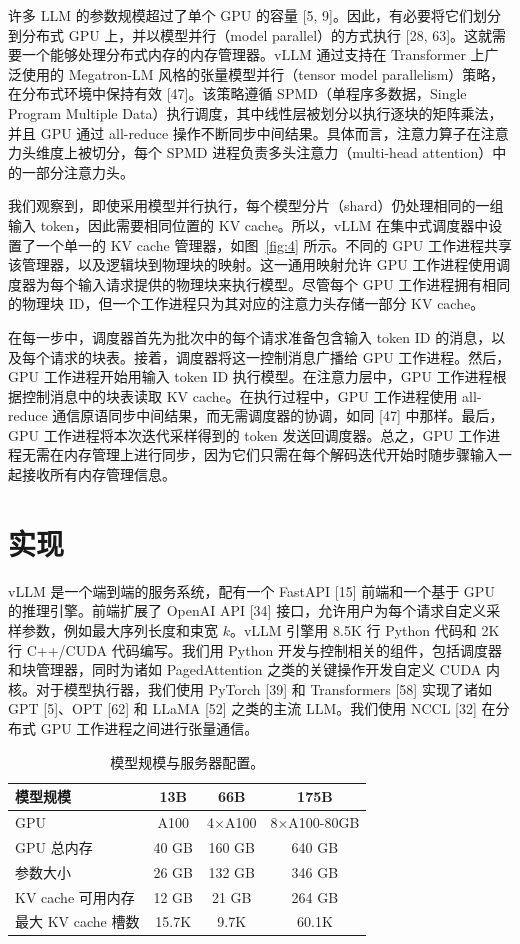 \documentclass[11pt,UTF8,fontset=fandol]{ctexart}
\begin{document}
许多 LLM 的参数规模超过了单个 GPU 的容量 [5, 9]。因此，有必要将它们划分到分布式 GPU 上，并以模型并行（model parallel）的方式执行 [28, 63]。这就需要一个能够处理分布式内存的内存管理器。vLLM 通过支持在 Transformer 上广泛使用的 Megatron-LM 风格的张量模型并行（tensor model parallelism）策略，在分布式环境中保持有效 [47]。该策略遵循 SPMD（单程序多数据，Single Program Multiple Data）执行调度，其中线性层被划分以执行逐块的矩阵乘法，并且 GPU 通过 all-reduce 操作不断同步中间结果。具体而言，注意力算子在注意力头维度上被切分，每个 SPMD 进程负责多头注意力（multi-head attention）中的一部分注意力头。

我们观察到，即使采用模型并行执行，每个模型分片（shard）仍处理相同的一组输入 token，因此需要相同位置的 KV cache。所以，vLLM 在集中式调度器中设置了一个单一的 KV cache 管理器，如图~\ref{fig:4} 所示。不同的 GPU 工作进程共享该管理器，以及逻辑块到物理块的映射。这一通用映射允许 GPU 工作进程使用调度器为每个输入请求提供的物理块来执行模型。尽管每个 GPU 工作进程拥有相同的物理块 ID，但一个工作进程只为其对应的注意力头存储一部分 KV cache。

在每一步中，调度器首先为批次中的每个请求准备包含输入 token ID 的消息，以及每个请求的块表。接着，调度器将这一控制消息广播给 GPU 工作进程。然后，GPU 工作进程开始用输入 token ID 执行模型。在注意力层中，GPU 工作进程根据控制消息中的块表读取 KV cache。在执行过程中，GPU 工作进程使用 all-reduce 通信原语同步中间结果，而无需调度器的协调，如同 [47] 中那样。最后，GPU 工作进程将本次迭代采样得到的 token 发送回调度器。总之，GPU 工作进程无需在内存管理上进行同步，因为它们只需在每个解码迭代开始时随步骤输入一起接收所有内存管理信息。

\section{实现}

vLLM 是一个端到端的服务系统，配有一个 FastAPI [15] 前端和一个基于 GPU 的推理引擎。前端扩展了 OpenAI API [34] 接口，允许用户为每个请求自定义采样参数，例如最大序列长度和束宽 $k$。vLLM 引擎用 8.5K 行 Python 代码和 2K 行 C++/CUDA 代码编写。我们用 Python 开发与控制相关的组件，包括调度器和块管理器，同时为诸如 PagedAttention 之类的关键操作开发自定义 CUDA 内核。对于模型执行器，我们使用 PyTorch [39] 和 Transformers [58] 实现了诸如 GPT [5]、OPT [62] 和 LLaMA [52] 之类的主流 LLM。我们使用 NCCL [32] 在分布式 GPU 工作进程之间进行张量通信。

\begin{table}[t]\centering
\caption{模型规模与服务器配置。}
\label{tab:1}
\begin{tabular}{lccc}
\toprule
模型规模 & 13B & 66B & 175B \\
\midrule
GPU & A100 & 4$\times$A100 & 8$\times$A100-80GB \\
GPU 总内存 & 40 GB & 160 GB & 640 GB \\
参数大小 & 26 GB & 132 GB & 346 GB \\
KV cache 可用内存 & 12 GB & 21 GB & 264 GB \\
最大 KV cache 槽数 & 15.7K & 9.7K & 60.1K \\
\bottomrule
\end{tabular}
\end{table}
\end{document}
